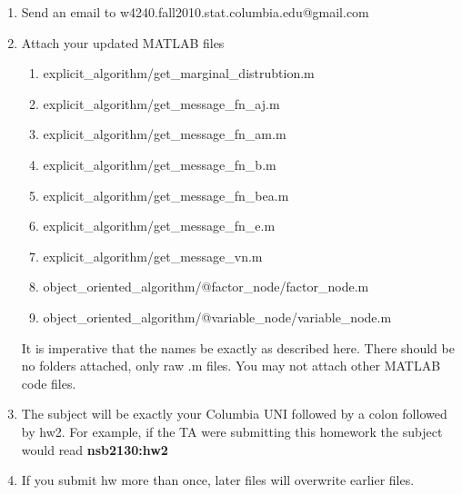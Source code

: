 \documentclass[12pt]{article}
\begin{document}
\begin{enumerate}
	\item Send an email to w4240.fall2010.stat.columbia.edu@gmail.com
	\item {Attach your updated MATLAB files 
		\begin{enumerate}
			\item explicit\_algorithm/get\_marginal\_distrubtion.m
			\item explicit\_algorithm/get\_message\_fn\_aj.m 
			\item explicit\_algorithm/get\_message\_fn\_am.m 
			\item explicit\_algorithm/get\_message\_fn\_b.m 
			\item explicit\_algorithm/get\_message\_fn\_bea.m
			\item explicit\_algorithm/get\_message\_fn\_e.m
			\item explicit\_algorithm/get\_message\_vn.m
			\item object\_oriented\_algorithm/@factor\_node/factor\_node.m
			\item object\_oriented\_algorithm/@variable\_node/variable\_node.m
		\end{enumerate} It is imperative that the names be exactly as described here. There should be no folders attached, only raw .m files.  You may not attach other MATLAB code files. }
	\item The subject will be exactly your Columbia UNI followed by a colon followed by hw2.  For example, if the TA were submitting this homework the subject would read {\bf nsb2130:hw2}
	\item If you submit hw more than once, later files will overwrite earlier files.
\end{enumerate}


\problemsdone
\end{document}
